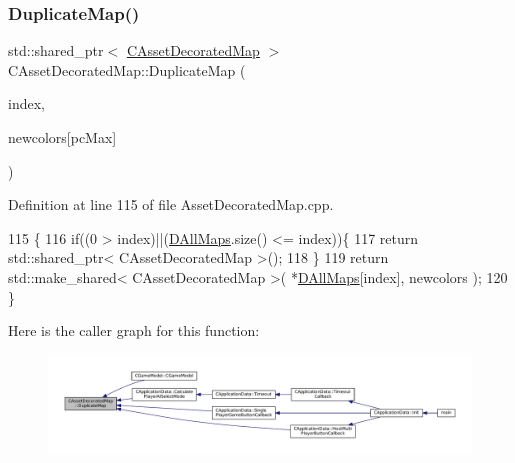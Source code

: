 \subsubsection{\texorpdfstring{Duplicate\+Map()}{DuplicateMap()}}
{\footnotesize\ttfamily std\+::shared\+\_\+ptr$<$ \hyperlink{classCAssetDecoratedMap}{C\+Asset\+Decorated\+Map} $>$ C\+Asset\+Decorated\+Map\+::\+Duplicate\+Map (\begin{DoxyParamCaption}\item[{int}]{index,  }\item[{\hyperlink{GameDataTypes_8h_aafb0ca75933357ff28a6d7efbdd7602f}{E\+Player\+Color}}]{newcolors\mbox{[}pc\+Max\mbox{]} }\end{DoxyParamCaption})\hspace{0.3cm}{\ttfamily [static]}}



Definition at line 115 of file Asset\+Decorated\+Map.\+cpp.


\begin{DoxyCode}
115                                                                                                            
       \{
116     \textcolor{keywordflow}{if}((0 > index)||(\hyperlink{classCAssetDecoratedMap_a32cdd80c7e9d31d8ce5397dd6d61dc4b}{DAllMaps}.size() <= index))\{
117         \textcolor{keywordflow}{return} std::shared\_ptr< CAssetDecoratedMap >();
118     \}
119     \textcolor{keywordflow}{return} std::make\_shared< CAssetDecoratedMap >( *\hyperlink{classCAssetDecoratedMap_a32cdd80c7e9d31d8ce5397dd6d61dc4b}{DAllMaps}[index], newcolors );
120 \}
\end{DoxyCode}
Here is the caller graph for this function\+:
\nopagebreak
\begin{figure}[H]
\begin{center}
\leavevmode
\includegraphics[width=350pt]{classCAssetDecoratedMap_a9d0fa2b32e4e8add6da83a7ebcfab6d8_icgraph}
\end{center}
\end{figure}
\hypertarget{classCAssetDecoratedMap_a82c30235ceaa63c7382c662687acf9fe}{}\label{classCAssetDecoratedMap_a82c30235ceaa63c7382c662687acf9fe} 
